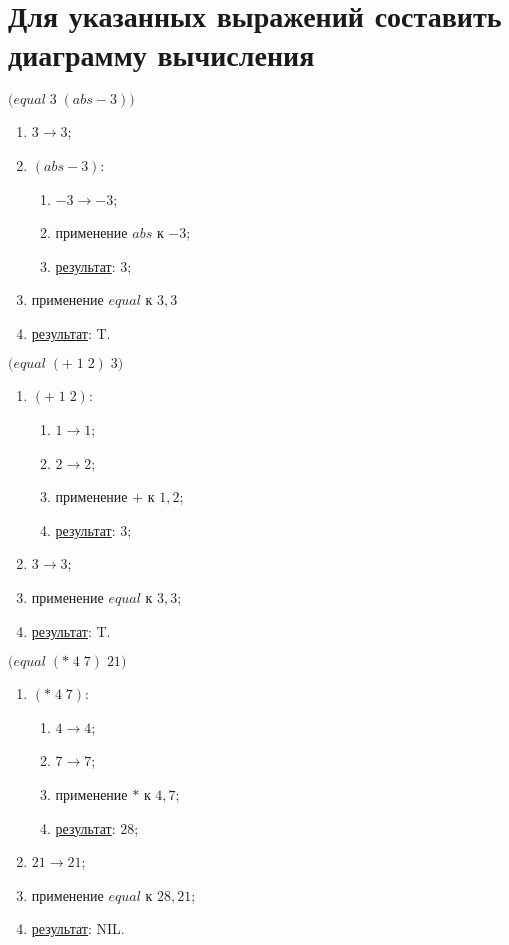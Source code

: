 
\section{Для указанных выражений составить диаграмму вычисления}

\vfill
\problem $\bigl(equal\; 3\; (abs -\!3)\bigr)$

\begin{enumerate}
	\item $3 \to 3$;
	\item $(abs -\!3)$:
	\begin{enumerate}
		\item $-3 \to -3$;
		\item применение $abs$ к $-3$;
		\item \underline{результат}: $3$;
	\end{enumerate}
	\item применение $equal$ к $3, 3$
	\item \underline{результат}: T.
\end{enumerate}
\vfill


\problem $\bigl(equal\; (+\; 1\; 2)\; 3\bigr)$

\begin{enumerate}
	\item $(+\; 1\; 2)$:
	\begin{enumerate}
		\item $1 \to 1$;
		\item $2 \to 2$;
		\item применение $+$ к $1, 2$;
		\item \underline{результат}: $3$;
	\end{enumerate}
	\item $3 \to 3$;
	\item применение $equal$ к $3, 3$;
	\item \underline{результат}: T.
\end{enumerate}
\vfill


\problem $\bigl(equal\; (*\; 4\; 7)\; 21\bigr)$

\begin{enumerate}
	\item $(*\; 4\; 7)$:
	\begin{enumerate}
		\item $4 \to 4$;
		\item $7 \to 7$;
		\item применение $*$ к $4, 7$;
		\item \underline{результат}: $28$;
	\end{enumerate}
	\item $21 \to 21$;
	\item применение $equal$ к $28, 21$;
	\item \underline{результат}: NIL.
\end{enumerate}


